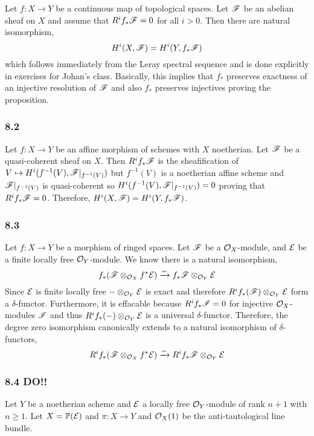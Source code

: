 \documentclass[12pt]{article}
\begin{document}
Let $f : X \to Y$ be a continuous map of topological spaces. Let $\mathscr{F}$ be an abelian sheaf on $X$ and assume that $R^i f_* \mathscr{F} = 0$ for all $i > 0$. Then there are natural isomorphism,
\[ H^i(X, \mathscr{F}) = H^i(Y, f_* \mathscr{F}) \]
which follows immediately from the Leray spectral sequence and is done explicitly in exercises for Johan's class. Basically, this implies that $f_*$ preserves exactness of an injective resolution of $\mathscr{F}$ and also $f_*$ preserves injectives proving the proposition.

\subsubsection{8.2}

Let $f : X \to Y$ be an affine morphism of schemes with $X$ noetherian. Let $\mathscr{F}$ be a quasi-coherent sheaf on $X$. Then $R^i f_* \mathscr{F}$ is the sheafification of $V \mapsto H^i(f^{-1}(V), \mathscr{F}|_{f^{-1}(V)})$ but $f^{-1}(V)$ is a noetherian affine scheme and $\mathscr{F} |_{f^{-1}(V)}$ is quasi-coherent so $H^i(f^{-1}(V), \mathscr{F}|_{f^{-1}(V)}) = 0$ proving that $R^i f_* \mathscr{F} = 0$. Therefore, $H^i(X, \mathscr{F}) = H^i(Y, f_* \mathscr{F})$.

\subsubsection{8.3}

Let $f : X \to Y$ be a morphism of ringed spaces. Let $\mathscr{F}$ be a $\mathcal{O}_{X}$-module, and $\mathcal{E}$ be a finite locally free $\mathcal{O}_{Y}$-module. We know there is a natural isomorphism,
\[ f_* (\mathscr{F} \otimes_{\mathcal{O}_{X}} f^* \mathcal{E}) \xrightarrow{\sim} f_* \mathscr{F} \otimes_{\mathcal{O}_{Y}} \mathcal{E} \]
Since $\mathcal{E}$ is finite locally free $- \otimes_{\mathcal{O}_{Y}} \mathcal{E}$ is exact and therefore $R^i f_* (\mathscr{F}) \otimes_{\mathcal{O}_{Y}} \mathcal{E}$ form a $\delta$-functor. Furthermore, it is effacable because $R^i f_* \mathscr{I} = 0$ for injective $\mathcal{O}_{X}$-modules $\mathscr{I}$ and thus $R^i f_* (-) \otimes_{\mathcal{O}_{Y}} \mathcal{E}$ is a universal $\delta$-functor. Therefore, the degree zero isomorphism canonically extends to a  natural isomorphism of $\delta$-functors,
\[ R^i f_* (\mathscr{F} \otimes_{\mathcal{O}_{X}} f^* \mathcal{E}) \xrightarrow{\sim} R^i f_* \mathscr{F} \otimes_{\mathcal{O}_{Y}} \mathcal{E} \]

\subsubsection{8.4 DO!!}

Let $Y$ be a noetherian scheme and $\mathcal{E}$ a locally free $\mathcal{O}_{Y}$-module of rank $n + 1$ with $n \ge 1$. Let $X = \mathbb{P}(\mathcal{E})$ and $\pi : X \to Y$ and $\mathcal{O}_{X}(1)$ be the anti-tautological line bundle.
\end{document}
